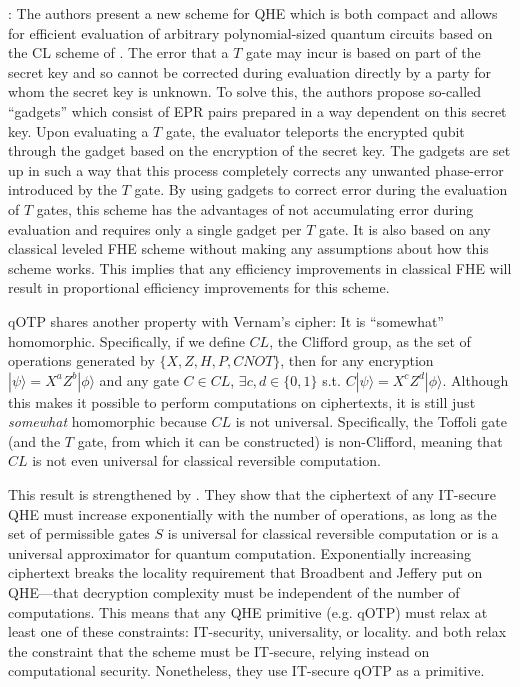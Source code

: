 \documentclass{article}
\newcommand{\ket}[1]{| #1 \rangle}
\begin{document}
\citet{dulek2016}: The authors present a new scheme for QHE which is both
compact and allows for efficient evaluation of arbitrary polynomial-sized
quantum circuits based on the CL scheme of \cite{broadbent2015}. The error that
a $T$ gate may incur is based on part of the secret key and so cannot be
corrected during evaluation directly by a party for whom the secret key is
unknown. To solve this, the authors propose so-called “gadgets” which consist of
EPR pairs prepared in a way dependent on this secret key. Upon evaluating a $T$
gate, the evaluator teleports the encrypted qubit through the gadget based on
the encryption of the secret key. The gadgets are set up in such a way that this
process completely corrects any unwanted phase-error introduced by the $T$ gate.
By using gadgets to correct error during the evaluation of $T$ gates, this
scheme has the advantages of not accumulating error during evaluation and
requires only a single gadget per $T$ gate. It is also based on any classical
leveled FHE scheme without making any assumptions about how this scheme works.
This implies that any efficiency improvements in classical FHE will result in
proportional efficiency improvements for this scheme.

qOTP shares another property with Vernam’s cipher: It is “somewhat” homomorphic.
Specifically, if we define $CL$, the Clifford group, as the set of operations
generated by $\{X,Z,H,P,CNOT\}$, then for any encryption $\ket{\psi} =
X^aZ^b\ket{\phi}$ and any gate $C \in CL$, $\exists c,d \in \{0,1\}$ s.t.
$C\ket{\psi} = X^cZ^d\ket{\phi}$. Although this makes it possible to perform
computations on ciphertexts, it is still just \textit{somewhat} homomorphic
because $CL$ is not universal. Specifically, the Toffoli gate (and the $T$ gate,
from which it can be constructed) is non-Clifford, meaning that $CL$ is not even
universal for classical reversible computation.

This result is strengthened by \citet{yu2014}. They show that the ciphertext of
any IT-secure QHE must increase exponentially with the number of operations, as
long as the set of permissible gates $S$ is universal for classical reversible
computation or is a universal approximator for quantum computation.
Exponentially increasing ciphertext breaks the locality requirement that
Broadbent and Jeffery put on QHE---that decryption complexity must be
independent of the number of computations. This means that any QHE primitive
(e.g. qOTP) must relax at least one of these constraints: IT-security,
universality, or locality. \citet{broadbent2015} and \citet{dulek2016} both
relax the constraint that the scheme must be IT-secure, relying instead on
computational security. Nonetheless, they use IT-secure qOTP as a primitive.
\end{document}
